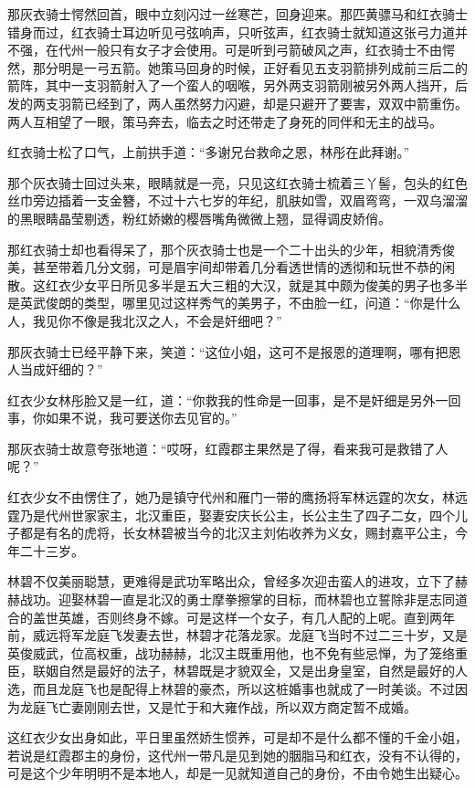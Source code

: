 那灰衣骑士愕然回首，眼中立刻闪过一丝寒芒，回身迎来。那匹黄骠马和红衣骑士错身而过，红衣骑士耳边听见弓弦响声，只听弦声，红衣骑士就知道这张弓力道并不强，在代州一般只有女子才会使用。可是听到弓箭破风之声，红衣骑士不由愕然，那分明是一弓五箭。她策马回身的时候，正好看见五支羽箭排列成前三后二的箭阵，其中一支羽箭射入了一个蛮人的咽喉，另外两支羽箭刚被另外两人挡开，后发的两支羽箭已经到了，两人虽然努力闪避，却是只避开了要害，双双中箭重伤。两人互相望了一眼，策马奔去，临去之时还带走了身死的同伴和无主的战马。

红衣骑士松了口气，上前拱手道：“多谢兄台救命之恩，林彤在此拜谢。”

那个灰衣骑士回过头来，眼睛就是一亮，只见这红衣骑士梳着三丫髻，包头的红色丝巾旁边插着一支金簪，不过十六七岁的年纪，肌肤如雪，双眉弯弯，一双乌溜溜的黑眼睛晶莹剔透，粉红娇嫩的樱唇嘴角微微上翘，显得调皮娇俏。

那红衣骑士却也看得呆了，那个灰衣骑士也是一个二十出头的少年，相貌清秀俊美，甚至带着几分文弱，可是眉宇间却带着几分看透世情的透彻和玩世不恭的闲散。这红衣少女平日所见多半是五大三粗的大汉，就是其中颇为俊美的男子也多半是英武俊朗的类型，哪里见过这样秀气的美男子，不由脸一红，问道：“你是什么人，我见你不像是我北汉之人，不会是奸细吧？”

那灰衣骑士已经平静下来，笑道：“这位小姐，这可不是报恩的道理啊，哪有把恩人当成奸细的？”

红衣少女林彤脸又是一红，道：“你救我的性命是一回事，是不是奸细是另外一回事，你如果不说，我可要送你去见官的。”

那灰衣骑士故意夸张地道：“哎呀，红霞郡主果然是了得，看来我可是救错了人呢？”

红衣少女不由愣住了，她乃是镇守代州和雁门一带的鹰扬将军林远霆的次女，林远霆乃是代州世家家主，北汉重臣，娶妻安庆长公主，长公主生了四子二女，四个儿子都是有名的虎将，长女林碧被当今的北汉主刘佑收养为义女，赐封嘉平公主，今年二十三岁。

林碧不仅美丽聪慧，更难得是武功军略出众，曾经多次迎击蛮人的进攻，立下了赫赫战功。迎娶林碧一直是北汉的勇士摩拳擦掌的目标，而林碧也立誓除非是志同道合的盖世英雄，否则终身不嫁。可是这样一个女子，有几人配的上呢。直到两年前，威远将军龙庭飞发妻去世，林碧才花落龙家。龙庭飞当时不过二三十岁，又是英俊威武，位高权重，战功赫赫，北汉主既重用他，也不免有些忌惮，为了笼络重臣，联姻自然是最好的法子，林碧既是才貌双全，又是出身皇室，自然是最好的人选，而且龙庭飞也是配得上林碧的豪杰，所以这桩婚事也就成了一时美谈。不过因为龙庭飞亡妻刚刚去世，又是忙于和大雍作战，所以双方商定暂不成婚。

这红衣少女出身如此，平日里虽然娇生惯养，可是却不是什么都不懂的千金小姐，若说是红霞郡主的身份，这代州一带凡是见到她的胭脂马和红衣，没有不认得的，可是这个少年明明不是本地人，却是一见就知道自己的身份，不由令她生出疑心。

